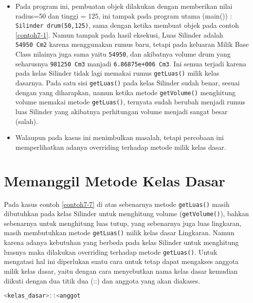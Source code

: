 \begin{itemize}

\item
  Pada program ini, pembuatan objek dilakukan dengan memberikan nilai
  radius=50 dan tinggi = 125, ini tampak pada program utama (main()) :
  \texttt{Silinder\ drum(50,125)}, sama dengan ketika membuat objek pada
  contoh \ref{contoh7-1}. Namun tampak pada hasil eksekusi, Luas Silinder adalah
  \texttt{54950\ Cm2} karena menggunakan rumus baru, tetapi pada
  keluaran Milik Base Class nilainya juga sama yaitu \texttt{54950}, dan
  akibatnya volume drum yang seharusnya \texttt{981250\ Cm3} manjadi
  \texttt{6.86875e+006\ Cm3}. Ini semua terjadi karena pada kelas
  Silinder tidak lagi memakai rumus \texttt{getLuas()} milik kelas
  dasarnya. Pada satu sisi \texttt{getLuas()} pada kelas Silinder sudah
  benar, sesuai dengan yang diharapkan, namun ketika metode
  \texttt{getVolume()} menghitung volume memakai metode
  \texttt{getLuas()}, ternyata sudah berubah menjadi rumus luas Silinder
  yang akibatnya perhitungan volume menjadi sangat besar (salah).
\item
  Walaupun pada kasus ini menimbulkan masalah, tetapi percobaan ini
  memperlihatkan adanya overriding terhadap metode milik kelas dasar.
\end{itemize}

\section{Memanggil Metode Kelas
Dasar}\label{memanggil-metode-kelas-dasar}

Pada kasus contoh \ref{contoh7-7} di atas sebenarnya metode \texttt{getLuas()} masih
dibutuhkan pada kelas Silinder untuk menghitung volume
(\texttt{getVolume()}), bahkan sebenarnya untuk menghitung luas tutup,
yang sebenarnya juga luas lingkaran, masih membutuhkan metode
\texttt{getLuas()} milik kelas dasar Lingkaran. Namun karena adanya
kebutuhan yang berbeda pada kelas Silinder untuk menghitung luasnya maka
dilakukan overriding terhadap metode \texttt{getLuas()}. Untuk mengatasi
hal ini diperlukan suatu cara untuk tetap dapat mengakses anggota milik
kelas dasar, yaitu dengan cara menyebutkan nama kelas dasar kemudian
diikuti dengan dua titik dua (::) dan anggota yang akan diakases.

\begin{lstlisting}[language=c++, numbers=none]
<kelas_dasar>::<anggot
\end{lstlisting}

